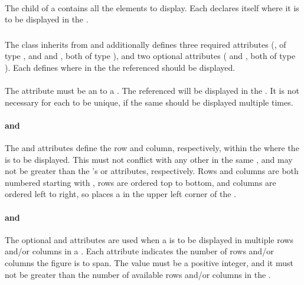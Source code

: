 \begin{blockChanged}
\paragraph*{}
The  child of a \Figure contains all the \Plot elements to display.  Each \SubPlot declares itself where it is to be displayed in the \Figure.


\subsubsection{}
\label{class:subPlot}

The \SubPlot class inherits from \SedBase and additionally defines three required attributes (, of type \SIdRef, and  and , both of type ), and two optional attributes ( and , both of type ).  Each \SubPlot defines where in the \Figure the referenced \Plot should be displayed.

\paragraph*{}
The  attribute must be an \SIdRef to a \Plot.  The referenced \Plot will be displayed in the \Figure.  It is not necessary for each  to be unique, if the same \Plot should be displayed multiple times.

\paragraph*{ and }
The  and  attributes define the row and column, respectively, within the \Figure where the \Plot is to be displayed.  This must not conflict with any other \SubPlot in the same \Figure, and may not be greater than the \Figure's  or  attributes, respectively.  Rows and columns are both numbered starting with , rows are ordered top to bottom, and columns are ordered left to right, so  places a \Plot in the upper left corner of the \Figure.

\paragraph*{ and }
The optional  and  attributes are used when a \Plot is to be displayed in multiple rows and/or columns in a \Figure.  Each attribute indicates the number of rows and/or columns the figure is to span.  The value must be a positive integer, and it must not be greater than the number of available rows and/or columns in the \Figure.


\end{blockChanged}
